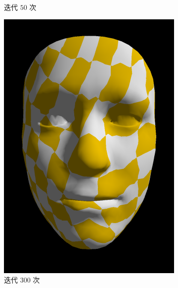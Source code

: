 \documentclass[UTF8]{ctexart}
\begin{document}
\begin{figure}[h]
\begin{subfigure}[b]{0.32\textwidth}
        \caption{迭代 $50$ 次}
    \end{subfigure}
    \hfill
    \begin{subfigure}[b]{0.32\textwidth}
        \centering
        \includegraphics[height=0.3\textheight]{images/2-2.png}
        \caption{迭代 $300$ 次}
    \end{subfigure}
    \hfill
    \begin{subfigure}[b]{0.32\textwidth}
        \centering

\end{subfigure}
\end{figure}
\end{document}
